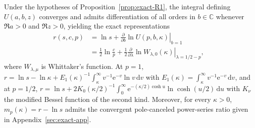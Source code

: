 \begin{proposition}\label{prop:exact-R2}
Under the hypotheses of Proposition~\ref{prop:exact-R1}, the integral defining $U(a,b,z)$ converges and admits differentiation of all orders in $b \in \mathbb{C}$ whenever $\Re a > 0$ and $\Re z > 0$, yielding the exact representations
\begin{equation}
\begin{split}
r(s,c,p) &= \ln s + \left.\frac{\partial}{\partial b}\ln U(p, b, \kappa)\right|_{b=1}\\
&= \frac{1}{2}\ln\frac{c}{p} + \frac{1}{2}\left.\frac{\partial}{\partial \lambda}\ln W_{\lambda, 0}(\kappa)\right|_{\lambda = 1/2 - p},
\end{split}
\label{eq:exact-tricomi}
\end{equation}
where $W_{\lambda,\mu}$ is Whittaker's function. At $p = 1$, $r = \ln s - \ln\kappa + E_1(\kappa)^{-1}\int_\kappa^\infty v^{-1}\mathrm{e}^{-v}\ln v\,\mathrm{d}v$ with $E_1(\kappa) = \int_\kappa^\infty v^{-1}\mathrm{e}^{-v}\,\mathrm{d}v$, and at $p = 1/2$, $r = \ln s + 2 K_0(\kappa/2)^{-1}\int_0^\infty \mathrm{e}^{-(\kappa/2)\cosh u}\ln\cosh(u/2)\,\mathrm{d}u$ with $K_\nu$ the modified Bessel function of the second kind. Moreover, for every $\kappa > 0$, $m_p(\kappa) = r - \ln s$ admits the convergent pole-canceled power-series ratio given in Appendix~\ref{sec:exact-app}.
\end{proposition}


